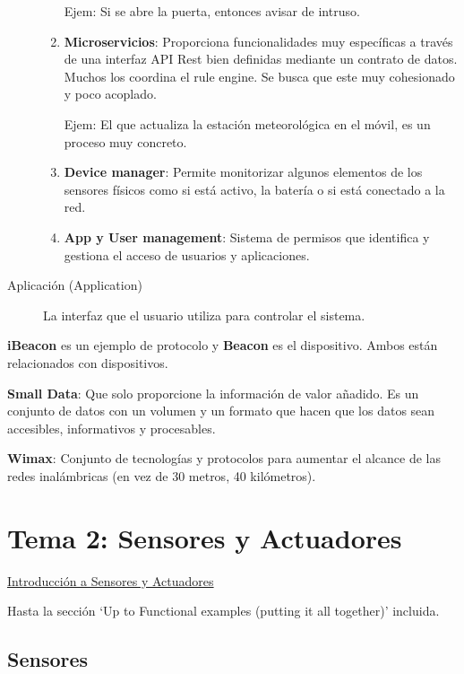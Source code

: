 \documentclass[12pt]{report} %
\begin{document}
\begin{description}
\begin{enumerate}
		Ejem: Si se abre la puerta, entonces avisar de intruso.
		\item
		\textbf{Microservicios}: Proporciona funcionalidades muy específicas a
		través de una interfaz API Rest bien definidas mediante un contrato de
		datos. Muchos los coordina el rule engine. Se busca que este muy
		cohesionado y poco acoplado.
		
		Ejem: El que actualiza la estación meteorológica en el móvil, es un
		proceso muy concreto.
		\item
		\textbf{Device manager}: Permite monitorizar algunos elementos de los
		sensores físicos como si está activo, la batería o si está conectado a
		la red.
		\item
		\textbf{App y User management}: Sistema de permisos que identifica y
		gestiona el acceso de usuarios y aplicaciones.
	\end{enumerate}

	\item[Aplicación (Application)] La interfaz que el usuario utiliza
	para controlar el sistema.

\end{description}

\textbf{iBeacon} es un ejemplo de protocolo y \textbf{Beacon} es el
dispositivo. Ambos están relacionados con dispositivos.

\textbf{Small Data}: Que solo proporcione la información de valor
añadido. Es un conjunto de datos con un volumen y un formato que hacen
que los datos sean accesibles, informativos y procesables.

\textbf{Wimax}: Conjunto de tecnologías y protocolos para aumentar el
alcance de las redes inalámbricas (en vez de 30 metros, 40 kilómetros).

\chapter{Tema 2: Sensores y
Actuadores}

\href{https://learning.oreilly.com/library/view/internet-of-things/9781788470599/d39be056-b166-476e-868e-c415e4dfa886.xhtml}{Introducción
a Sensores y Actuadores} 

Hasta la sección `Up to Functional examples
(putting it all together)' incluida.

\section{Sensores}
\end{document}

